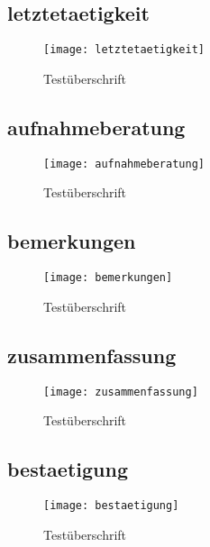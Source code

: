 \begin{landscape}
\subsection{letztetaetigkeit}
\label{section-letztetaetigkeit}
\begin{figure}[H]
    \centering
    \caption{Testüberschrift}
    \begin{adjustbox}{width=\linewidth, center}
        \texttt{[image: letztetaetigkeit]}
    \end{adjustbox}
\end{figure}

\subsection{aufnahmeberatung}
\label{section-aufnahmeberatung}
\begin{figure}[H]
    \centering
    \caption{Testüberschrift}
    \begin{adjustbox}{width=\linewidth, center}
        \texttt{[image: aufnahmeberatung]}
    \end{adjustbox}
\end{figure}

\subsection{bemerkungen}
\label{section-bemerkungen}
\begin{figure}[H]
    \centering
    \caption{Testüberschrift}
    \begin{adjustbox}{width=\linewidth, center}
        \texttt{[image: bemerkungen]}
    \end{adjustbox}
\end{figure}

\subsection{zusammenfassung}
\label{section-zusammenfassung}
\begin{figure}[H]
    \centering
    \caption{Testüberschrift}
    \begin{adjustbox}{width=\linewidth, center}
        \texttt{[image: zusammenfassung]}
    \end{adjustbox}
\end{figure}

\subsection{bestaetigung}
\label{section-bestaetigung}
\begin{figure}[H]
    \centering
    \caption{Testüberschrift}
    \begin{adjustbox}{width=\linewidth, center}
        \texttt{[image: bestaetigung]}
    \end{adjustbox}
\end{figure}


\end{landscape}
